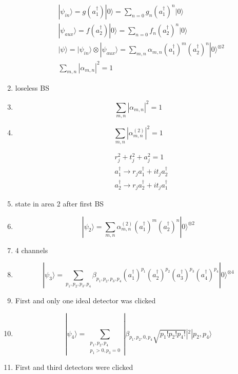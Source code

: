 \documentclass[12pt]{article}
\begin{document}
\begin{enumerate}
\begin{align*}
& |\psi_{in}\rangle = g(a_{1}^{\dag})|0\rangle  = \sum_{n=0} g_{n} (a_{1}^{\dag})^{n} |0\rangle  \\ 
& |\psi_{aux}\rangle = f(a_{2}^{\dag})|0\rangle  = \sum_{n=0} f_{n} (a_{2}^{\dag})^{n} |0\rangle  \\
& |\psi\rangle = |\psi_{in}\rangle   \otimes   |\psi_{aux}\rangle = \sum_{m,n} \alpha_{m,n} (a_{1}^{\dag})^{m} (a_{2}^{\dag})^{n} |0\rangle^{\otimes 2} \\
& \sum_{m,n} |\alpha_{m,n}|^2 = 1 
\end{align*}

\item loseless BS

\item $$ \sum_{m,n} |\alpha_{m,n}|^2 = 1 $$

\item $$ \sum_{m,n} |\alpha_{m,n}^{(2)}|^2 = 1 $$

\begin{align*}
&  r_{j}^2 + t_{j}^2 + a_{j}^2 = 1 \\
&  a_{1}^{\dag} \rightarrow  r_{j}a_{1}^{\dag} + it_{j}a_{2}^{\dag} \\
&  a_{2}^{\dag} \rightarrow  r_{j}a_{2}^{\dag} + it_{j}a_{1}^{\dag} 
\end{align*}


\item state in area 2 after first BS

\item $$ |\psi_{2}\rangle = \sum_{m,n} \alpha_{m,n}^{(2)} (a_{1}^{\dag})^{m} (a_{2}^{\dag})^{n} |0\rangle^{\otimes 2}  $$

\item 4 channels

\item $$ |\psi_3\rangle = \sum_{p_{1},p_{2},p_{3},p_{4}} \beta_{p_{1},p_{2},p_{3},p_{4}} (a_{1}^{\dag})^{p_{1}} (a_{2}^{\dag})^{p_{2}} (a_{3}^{\dag})^{p_{3}} (a_{4}^{\dag})^{p_{4}} |0\rangle^{\otimes 4}  $$


\item First and only one ideal detector was clicked

\item $$ |\psi_4\rangle = \sum_{\substack{p_{1},p_{2},p_{4} \\ p_{1} > 0, p_{3}=0}} |\beta_{p_{1},p_{2},0,p_{4}} \sqrt{p_{1}!p_{2}!p_{4}!}|^2 |p_{2}, p_{4}\rangle $$

\item First and third detectors were clicked


\end{enumerate}
\end{document}
